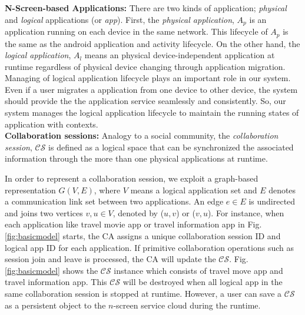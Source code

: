 \documentclass[conference]{IEEEtran}
\begin{document}
\noindent
\textbf{N-Screen-based Applications: }
There are two kinds of application; \textit{physical} and \textit{logical} applications (or \textit{app}).
First, the \textit{physical application}, $A_p$ is an application running on each device in the same network.  
This lifecycle of  $A_p$ is the same as the android application and activity lifecycle.
On the other hand, the \textit{logical application}, $A_l$ means an physical device-independent application at runtime regardless of physical device changing through application migration.
Managing of logical application lifecycle plays an important role in our system.
Even if a user migrates a application from one device to other device, 
the system should provide the the application service  seamlessly and consistently. 
So, our system manages the logical application lifecycle to maintain the running states of application with contexts.\\

\noindent
\textbf{Collaboration sessions: }
Analogy to a social community, the \textit{collaboration session}, $\mathcal{CS}$ is defined as a logical space  that can be synchronized the associated information through the more than one physical applications at runtime.

In order to represent a collaboration session, we exploit a graph-based representation $G(V, E)$, where $V$ means a logical application set and $E$ denotes a communication link set between two applications. An edge $e \in E$ is undirected and joins two vertices $v, u \in V$, denoted by ($u, v$) or ($v, u$). 
For instance, 
when each application like travel movie app or travel information app in Fig. \ref{fig:basicmodel} starts, the CA assigns a unique collaboration session ID and logical app ID for each application. If primitive collaboration operations such as session join and leave is processed, the CA will update the $\mathcal{CS}$. Fig. \ref{fig:basicmodel} shows the  $\mathcal{CS}$ instance which consists of travel move app and travel information app. This $\mathcal{CS}$ will be destroyed when all logical app in the same collaboration session is stopped at runtime. However, a user can save a $\mathcal{CS}$ as a persistent object to the $n$-screen service cloud during the runtime.\\

\end{document}
